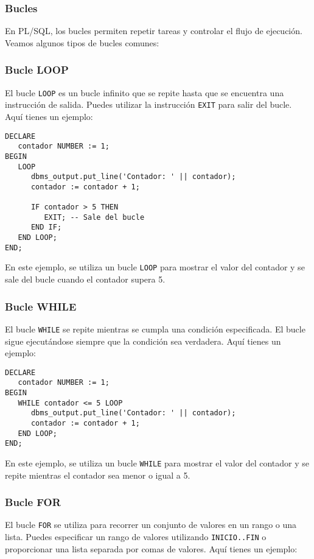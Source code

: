 \documentclass[executivepaper]{article}
\begin{document}
\subsubsection*{Bucles}

En PL/SQL, los bucles permiten repetir tareas y controlar el flujo de ejecución. Veamos algunos tipos de bucles comunes:

\subsubsection*{Bucle LOOP}
El bucle \texttt{LOOP} es un bucle infinito que se repite hasta que se encuentra una instrucción de salida. Puedes utilizar la instrucción \texttt{EXIT} para salir del bucle. Aquí tienes un ejemplo:

\begin{lstlisting}
DECLARE
   contador NUMBER := 1;
BEGIN
   LOOP
      dbms_output.put_line('Contador: ' || contador);
      contador := contador + 1;
      
      IF contador > 5 THEN
         EXIT; -- Sale del bucle
      END IF;
   END LOOP;
END;
\end{lstlisting}

En este ejemplo, se utiliza un bucle \texttt{LOOP} para mostrar el valor del contador y se sale del bucle cuando el contador supera 5.

\subsubsection*{Bucle WHILE}
El bucle \texttt{WHILE} se repite mientras se cumpla una condición especificada. El bucle sigue ejecutándose siempre que la condición sea verdadera. Aquí tienes un ejemplo:

\begin{lstlisting}
DECLARE
   contador NUMBER := 1;
BEGIN
   WHILE contador <= 5 LOOP
      dbms_output.put_line('Contador: ' || contador);
      contador := contador + 1;
   END LOOP;
END;
\end{lstlisting}

En este ejemplo, se utiliza un bucle \texttt{WHILE} para mostrar el valor del contador y se repite mientras el contador sea menor o igual a 5.

\subsubsection*{Bucle FOR}
El bucle \texttt{FOR} se utiliza para recorrer un conjunto de valores en un rango o una lista. Puedes especificar un rango de valores utilizando \texttt{INICIO..FIN} o proporcionar una lista separada por comas de valores. Aquí tienes un ejemplo:
\end{document}

